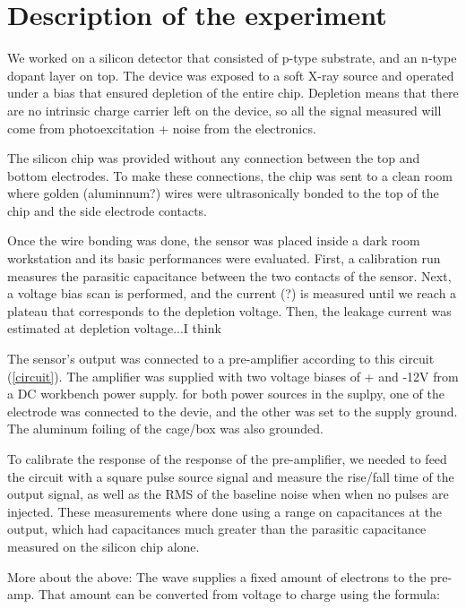 \documentclass[12pt]{article}
\begin{document}
\maketitle

\section{Description of the experiment}

We worked on a silicon detector that consisted of p-type substrate, and an n-type dopant layer on top. The device was exposed to a soft X-ray source and operated under a bias that ensured depletion of the entire chip. Depletion means that there are no intrinsic charge carrier left on the device, so all the signal measured will come from photoexcitation + noise from the electronics.

The silicon chip was provided without any connection between the top and bottom electrodes. To make these connections, the chip was sent to a clean room where golden (aluminnum?) wires were ultrasonically bonded to the top of the chip and the side electrode contacts.

Once the wire bonding was done, the sensor was placed inside a dark room workstation and its basic performances were evaluated. First, a calibration run measures the parasitic capacitance between the two contacts of the sensor. Next, a voltage bias scan is performed, and the current (?) is measured until we reach a plateau that corresponds to the depletion voltage. Then, the leakage current was estimated at depletion voltage...I think


The sensor's output was connected to a pre-amplifier according to this circuit (\ref{circuit}). The amplifier was supplied with two voltage biases of + and -12V from a DC workbench power supply. for both power sources in the suplpy, one of the electrode was connected to the devie, and the other was set to the supply ground. The aluminum foiling of the cage/box was also grounded.


To calibrate the response of the response of the pre-amplifier, we needed to feed the circuit with a square pulse source signal and measure the rise/fall time of the output signal, as well as the RMS of the baseline noise when when no pulses are injected. These measurements where done using a range on capacitances at the output, which had capacitances much greater than the parasitic capacitance measured on the silicon chip alone.

More about the above: The wave supplies a fixed amount of electrons to the pre-amp. That amount can be converted from voltage to charge using the formula:
\end{document}
